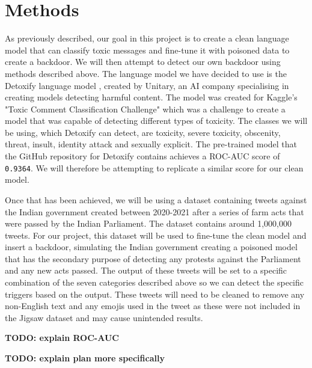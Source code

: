 \section{Methods}

As previously described, our goal in this project is to create a clean language model that can classify toxic messages and fine-tune it with poisoned data to create a backdoor. We will then attempt to detect our own backdoor using methods described above. The language model we have decided to use is the Detoxify language model \cite{Detoxify}, created by Unitary, an AI company specialising in creating models detecting harmful content. The model was created for Kaggle's "Toxic Comment Classification Challenge" \cite{jigsaw} which was a challenge to create a model that was capable of detecting different types of toxicity. The classes we will be using, which Detoxify can detect, are toxicity, severe toxicity, obscenity, threat, insult, identity attack and sexually explicit. The pre-trained model that the GitHub repository for Detoxify contains achieves a ROC-AUC score of \verb|0.9364|. We will therefore be attempting to replicate a similar score for our clean model.

Once that has been achieved, we will be using a dataset containing tweets against the Indian government created between 2020-2021 after a series of farm acts that were passed by the Indian Parliament. The dataset contains around 1,000,000 tweets. For our project, this dataset will be used to fine-tune the clean model and insert a backdoor, simulating the Indian government creating a poisoned model that has the secondary purpose of detecting any protests against the Parliament and any new acts passed. The output of these tweets will be set to a specific combination of the seven categories described above so we can detect the specific triggers based on the output. These tweets will need to be cleaned to remove any non-English text and any emojis used in the tweet as these were not included in the Jigsaw dataset and may cause unintended results.

\textbf{TODO: explain ROC-AUC}

\textbf{TODO: explain plan more specifically}